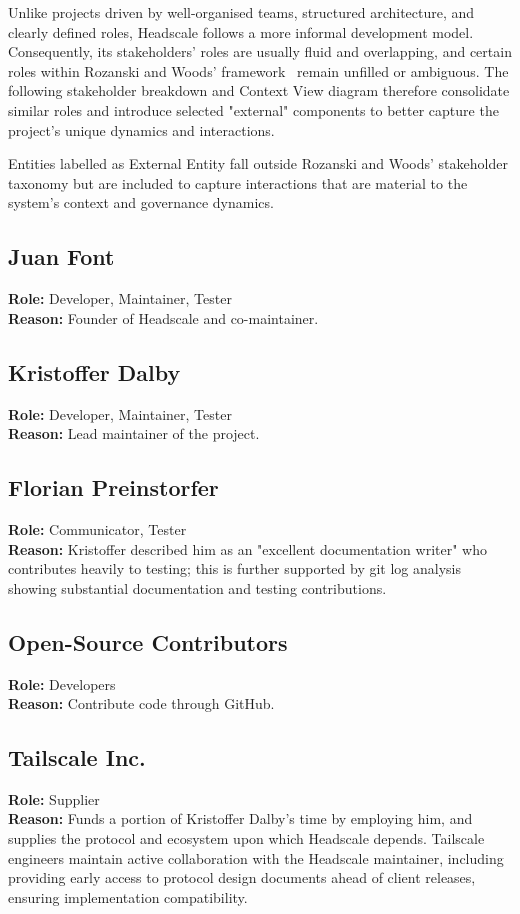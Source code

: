 \documentclass[11pt, a4paper]{article}
\begin{document}
Unlike projects driven by well-organised teams, structured architecture, and clearly defined roles, Headscale follows a more informal development model. Consequently, its stakeholders' roles are usually fluid and overlapping, and certain roles within Rozanski and Woods' framework~\cite{R&W_2011} remain unfilled or ambiguous. The following stakeholder breakdown and Context View diagram therefore consolidate similar roles and introduce selected "external" components to better capture the project's unique dynamics and interactions.

Entities labelled as External Entity fall outside Rozanski and Woods' stakeholder taxonomy but are included to capture interactions that are material to the system's context and governance dynamics.

\subsection{Juan Font}
\textbf{Role:} Developer, Maintainer, Tester \\
\textbf{Reason:} Founder of Headscale and co-maintainer.

\subsection{Kristoffer Dalby}
\textbf{Role:} Developer, Maintainer, Tester \\
\textbf{Reason:} Lead maintainer of the project.

\subsection{Florian Preinstorfer}
\textbf{Role:} Communicator, Tester \\
\textbf{Reason:} Kristoffer described him as an "excellent documentation writer" who contributes heavily to testing; this is further supported by git log analysis showing substantial documentation and testing contributions.

\subsection{Open-Source Contributors}
\textbf{Role:} Developers \\
\textbf{Reason:} Contribute code through GitHub.

\subsection{Tailscale Inc.}
\textbf{Role:} Supplier \\
\textbf{Reason:} Funds a portion of Kristoffer Dalby's time by employing him, and supplies the protocol and ecosystem upon which Headscale depends. Tailscale engineers maintain active collaboration with the Headscale maintainer, including providing early access to protocol design documents ahead of client releases, ensuring implementation compatibility.
\end{document}
